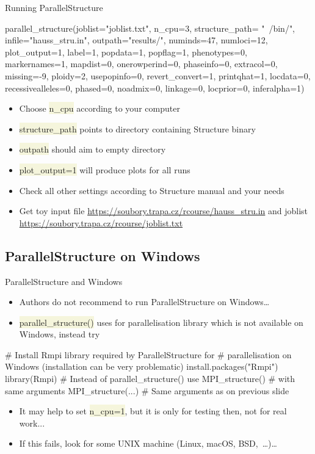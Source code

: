 \documentclass[compress, ucs, xelatex, 11pt, xcolor=svgnames, aspectratio=169,
	hyperref={
		bookmarks=true,
		unicode=true,
		colorlinks=true,
		pdftitle={Molecular data in R},
		plainpages=false,
		pdfauthor={Vojtech Zeisek},
		pdfsubject={Course about phylogeny and evolution in R},
		pdfcreator={XeLaTeX},
		pdfkeywords={R, evolution, phylogeny, molecular data},
		linkcolor=Crimson, %
		anchorcolor=Magenta, %
		citecolor=Magenta, %
		filecolor=Magenta, %
		menucolor=Magenta, %
		urlcolor=DodgerBlue, %
		pdftex},
	url={hyphens, lowtilde} %
	]{beamer}
\renewcommand{\texttt}[1]{\colorbox{Beige}{{\ttfamily #1}}}
\begin{document}
\begin{frame}[fragile]{Running ParallelStructure}
	\begin{spluscode}
    parallel_structure(joblist="joblist.txt", n_cpu=3, structure_path=
      "~/bin/", infile="hauss_stru.in", outpath="results/", numinds=47,
      numloci=12, plot_output=1, label=1, popdata=1, popflag=1,
      phenotypes=0, markernames=1, mapdist=0, onerowperind=0, phaseinfo=0,
      extracol=0, missing=-9, ploidy=2, usepopinfo=0, revert_convert=1,
      printqhat=1, locdata=0, recessivealleles=0, phased=0, noadmix=0,
      linkage=0, locprior=0, inferalpha=1)
	\end{spluscode}
	\begin{itemize}
		\item Choose \texttt{n\_cpu} according to your computer
		\item \texttt{structure\_path} points to \alert{directory} containing Structure binary
		\item \texttt{outpath} should aim to \alert{empty} directory
		\item \texttt{plot\_output=1} will produce plots for all runs
		\item Check all other settings according to Structure manual and your needs
		\item Get toy input file \url{https://soubory.trapa.cz/rcourse/hauss_stru.in} and joblist \url{https://soubory.trapa.cz/rcourse/joblist.txt}
	\end{itemize}
\end{frame}

\subsection{ParallelStructure on Windows}

\begin{frame}[fragile]{ParallelStructure and Windows}
	\begin{itemize}
		\item Authors do not recommend to run ParallelStructure on Windows\ldots
		\item \texttt{parallel\_structure()} uses for parallelisation library which is not available on Windows, instead try
	\end{itemize}
	\begin{spluscode}
    # Install Rmpi library required by ParallelStructure for
    # parallelisation on Windows (installation can be very problematic)
    install.packages("Rmpi")
    library(Rmpi)
    # Instead of parallel_structure() use MPI_structure()
    # with same arguments
    MPI_structure(...) # Same arguments as on previous slide
	\end{spluscode}
	\begin{itemize}
		\item It may help to set \texttt{n\_cpu=1}, but it is only for testing then, not for real work...
		\item If this fails, look for some UNIX machine (Linux, macOS, BSD,~\ldots)\ldots
	\end{itemize}
\end{frame}
\end{document}

